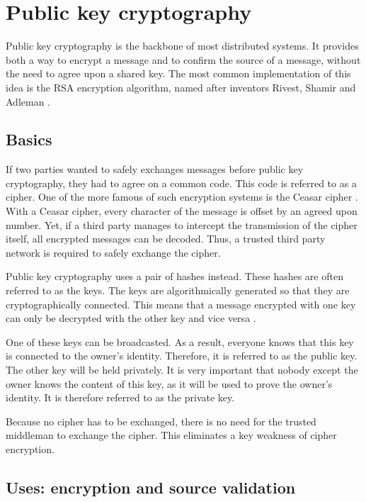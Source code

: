 \section{Public key cryptography}

Public key cryptography is the backbone of most distributed systems. It provides both a way to encrypt a message and to confirm the source of a message, without the need to agree upon a shared key. The most common implementation of this idea is the RSA encryption algorithm, named after inventors Rivest, Shamir and Adleman \cite{rsa-patent}. 

\subsection{Basics}

If two parties wanted to safely exchanges messages before public key cryptography, they had to agree on a common code. This code is referred to as a cipher. One of the more famous of such encryption systems is the Ceasar cipher \cite{ceasar-cypher}. With a Ceasar cipher, every character of the message is offset by an agreed upon number. Yet, if a third party manages to intercept the transmission of the cipher itself, all encrypted messages can be decoded. Thus, a trusted third party network is required to safely exchange the cipher.

Public key cryptography uses a pair of hashes instead. These hashes are often referred to as the keys. The keys are algorithmically generated so that they are cryptographically connected. This means that a message encrypted with one key can only be decrypted with the other key and vice versa \cite{rsa-paper-explanation}.

One of these keys can be broadcasted. As a result, everyone knows that this key is connected to the owner's identity. Therefore, it is referred to as the public key. The other key will be held privately. It is very important that nobody except the owner knows the content of this key, as it will be used to prove the owner's identity. It is therefore referred to as the private key.

Because no cipher has to be exchanged, there is no need for the trusted middleman to exchange the cipher. This eliminates a key weakness of cipher encryption.

\subsection{Uses: encryption and source validation}

